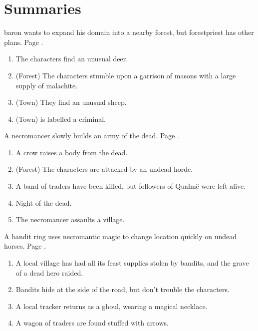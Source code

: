 \setcounter{encnum}{1}

\section{Summaries}

\begin{multicols}{2}


\gls{baron} wants to expand his domain into a nearby forest, but \gls{forestpriest} has other plans.
Page \pageref{herenofarther}.

\begin{enumerate}
	\item{The characters find an unusual deer.}
	\item{(Forest) The characters stumble upon a garrison of masons with a large supply of malachite.}
	\item{(Town) They find an unusual sheep.}
	\item{(Town)  is labelled a criminal.}
\end{enumerate}

A necromancer slowly builds an army of the dead.
Page \pageref{necromancerspet}.

\begin{enumerate}
	\item{A crow raises a body from the dead.}
	\item{(Forest) The characters are attacked by an undead horde.}
	\item{A band of traders have been killed, but followers of Qualm\"{e} were left alive.}
	\item{Night of the dead.}
	\item{ The necromancer assaults a village.}
\end{enumerate}

A bandit ring uses necromantic magic to change location quickly on undead horses.
Page \pageref{immortalbandits}.

\begin{enumerate}

	\item{A local village has had all its feast supplies stolen by bandits, and the grave of a dead hero raided.}
	\item{Bandits hide at the side of the road, but don't trouble the characters.}
	\item{A local tracker returns as a ghoul, wearing a magical necklace.}
	\item{A wagon of traders are found stuffed with arrows.}
\end{enumerate}


\end{multicols}
